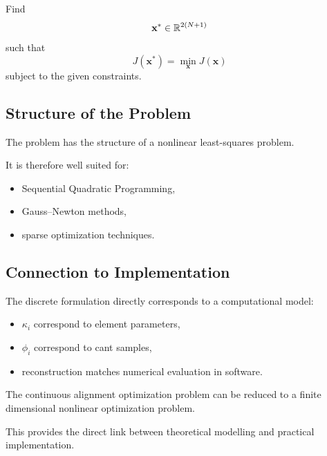 \begin{definition}
Find
\[
\mathbf{x}^\ast \in \mathbb{R}^{2(N+1)}
\]
such that
\[
J(\mathbf{x}^\ast)
=
\min_{\mathbf{x}} J(\mathbf{x})
\]
subject to the given constraints.
\end{definition}

\subsection{Structure of the Problem}

The problem has the structure of a nonlinear least-squares problem.

It is therefore well suited for:
\begin{itemize}
\item Sequential Quadratic Programming,
\item Gauss--Newton methods,
\item sparse optimization techniques.
\end{itemize}

\subsection{Connection to Implementation}

The discrete formulation directly corresponds to a computational model:
\begin{itemize}
\item \(\kappa_i\) correspond to element parameters,
\item \(\phi_i\) correspond to cant samples,
\item reconstruction matches numerical evaluation in software.
\end{itemize}

\begin{summary}
The continuous alignment optimization problem can be reduced to a finite
dimensional nonlinear optimization problem.

This provides the direct link between theoretical modelling and
practical implementation.
\end{summary}

